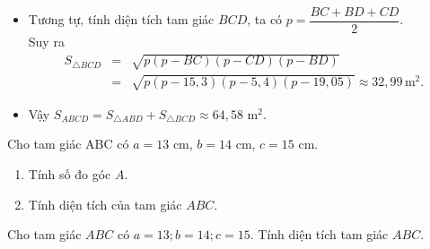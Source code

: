 \begin{bt}
{\begin{itemize}
			\item Tương tự, tính diện tích tam giác $BCD$, ta có
			$p=\dfrac{BC+BD+CD}{2}$.\\
			Suy ra 
			\begin{eqnarray*}
				S_{\triangle BCD}&=&\sqrt{p(p-BC)(p-CD)(p-BD)}\\
				&=&\sqrt{p(p-15{,}3)(p-5{,}4)(p-19{,}05)}\approx 32{,}99\, \text{m}^2.
			\end{eqnarray*}
			
			\item Vậy $S_{ABCD}=S_{\triangle ABD}+S_{\triangle BCD}\approx 64{,}58$ m$^2$.
		\end{itemize}
	}
\end{bt}

\begin{bt}%
	Cho tam giác ABC có $a = 13$ cm, $b=14$ cm, $c=15$ cm.
	\begin{enumerate}
		\item Tính số đo góc $A$.
		\item Tính diện tích của tam giác $ABC$.
	\end{enumerate}
\end{bt}

\begin{bt}%
 Cho tam giác $ABC$ có $a=13 ; b=14 ; c=15$. Tính diện tích tam giác $ABC$.
\end{bt}

